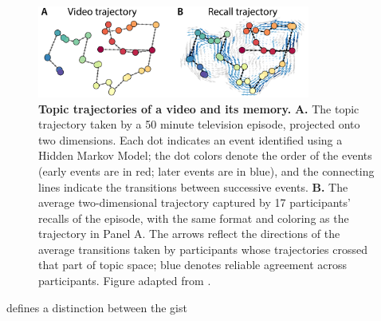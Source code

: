 \documentclass{article}
\begin{document}
\begin{figure}[tp]
\centering
\includegraphics[width=0.8\textwidth]{figs/trajectory}
\caption{\textbf{Topic trajectories of a video and its memory.}  \textbf{A.} The topic trajectory taken by a 50 minute television episode, projected onto two dimensions.  Each dot indicates an event identified using a Hidden Markov Model; the dot colors denote the order of the events (early events are in red; later events are in blue), and the connecting lines indicate the transitions between successive events.  \textbf{B.} The average two-dimensional trajectory captured by 17 participants' recalls of the episode, with the same format and coloring as the trajectory in Panel A. The arrows reflect the directions of the average transitions taken by participants whose trajectories crossed that part of topic space; blue denotes reliable agreement across participants.  Figure adapted from \cite{HeusEtal18c}.}
\label{fig:trajectories}
\end{figure}



defines a distinction between the gist
\end{document}
